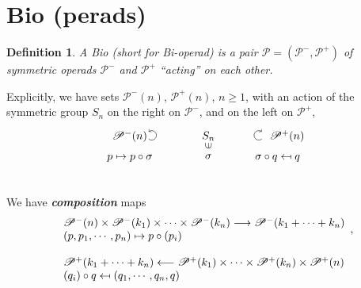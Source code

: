 \documentclass[leqno]{article}
\newcommand{\myemph}[1]{{\it{\bf{#1}}}}
\newcommand{\biop}{\mathscr{P}}
\newtheorem{definition}[equation]{Definition} %
\numberwithin{equation}{section}
\begin{document}
\section{Bio (perads)} \label{sec:1}
\begin{definition}
				A Bio (short for Bi-operad) is a pair $\biop=(\biop^{-},\biop^{+})$ of symmetric
				operads $\biop^{-}$ and $\biop^{+}$ ``acting'' on each other. 
				\label{def:1.1}
\end{definition}
Explicitly, we have sets $\biop^{-}(n)$, $\biop^{+}(n)$, $n\ge 1$, with an action
of the symmetric group $S_{n}$ on the right on $\biop^{-}$, and on the left on
$\biop^{+}$,
\begin{equation}
				\begin{aligned}
\begin{tikzpicture}[baseline=0mm]
				 \draw[->] (16mm,14.1mm) arc [start angle=-130, end angle=130, radius=1.5mm];
				 \node at (10mm,15mm) {$\biop^{-}(n)$};
				 \node at (10mm,8mm) {$p\mapsto p\circ \sigma$};
				 \node at (35mm,15mm) {$S_{n}$};
				 \node at (35mm,12mm) {\rotatebox{90}{$\in$}};
				 \node at (35mm,8.5mm) {$\sigma$};
				 \node at (60mm,15mm) {$\biop^{+}(n)$};
				 \draw[->] (52mm,14.1mm) arc [start angle=130, end angle=-130, radius=-1.5mm];
				 \node at (57mm,8mm) {$\sigma\circ q\mapsfrom q$};
\end{tikzpicture}
				\end{aligned}
\label{eq:1.2}
\end{equation}
We have \myemph{composition} maps
\begin{equation}
				\begin{array}[H]{l}
				\begin{array}[H]{lll}
								\biop^{-}(n)\times \biop^{-}(k_1)\times \cdots \times
								\biop^{-}(k_{n})\longrightarrow \biop^{-}(k_1+\cdots+k_n)    \\
								(p,p_1,\cdots, p_{n})\mapsto p\circ(p_{i}) 			
				\end{array}, \\\\
				\begin{array}[H]{l}
								\biop^{+}(k_1+\cdots +k_n) \longleftarrow \biop^{+}(k_1)\times \cdots \times
								\biop^{+}(k_n)\times\biop^{+}(n) \\
								(q_i)\circ q\mapsfrom (q_1,\cdots , q_n,q) 
				\end{array}
				\end{array}
				\label{eq:1.3}
\end{equation}
\end{document}

